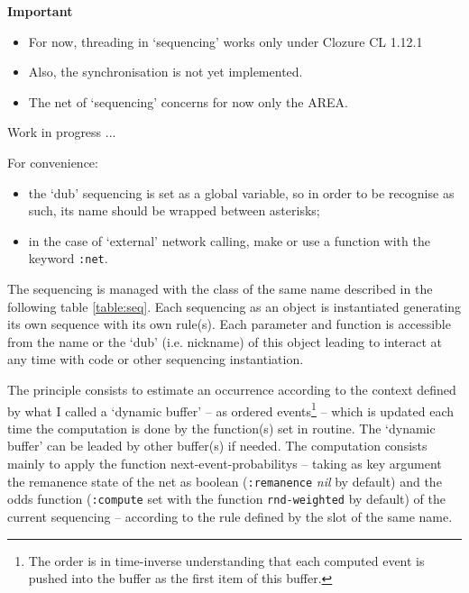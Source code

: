  \begin{notes}

{\large \textbf{Important}}

\begin{itemize}

\item For now, threading in `sequencing' works only under Clozure CL 1.12.1

\item Also, the synchronisation is not yet implemented.

\item The  net of  `sequencing'  concerns for now only the AREA.
 
\end{itemize}

Work in progress ...

\hrulefill 

For convenience:
\begin{itemize}

\item the `dub' sequencing is set as a global variable, so in order to be recognise as such, its name should be wrapped between asterisks;

\item in the case of `external' network calling, make or use a function with the keyword \texttt{:net}.
 
\end{itemize}

\end{notes}

\bigskip

The sequencing is managed with the class of the same name described in the following table \ref{table:seq}. Each sequencing as an object is instantiated generating its own sequence with its own rule(s). Each parameter and function is accessible from the name or the `dub' (i.e. nickname) of this object leading to interact at any time with code or other sequencing instantiation.

\smallskip

The principle consists to estimate an occurrence according to the context defined by what I called a `dynamic buffer' -- as ordered events\footnote{The order is in time-inverse understanding that each computed event is pushed into the buffer as the first item of this buffer.} -- which is updated each time the computation is done by the function(s) set in routine. The `dynamic buffer' can be leaded by other buffer(s) if needed. The computation consists mainly to apply the function \glspl{next-event-probability} -- taking as key argument the remanence state of the net as boolean (\texttt{:remanence} \textit{nil} by default)  and the odds function (\texttt{:compute} set with the function \texttt{rnd-weighted} by default) of the current sequencing --  according to the rule defined by the slot of the same name.  %

